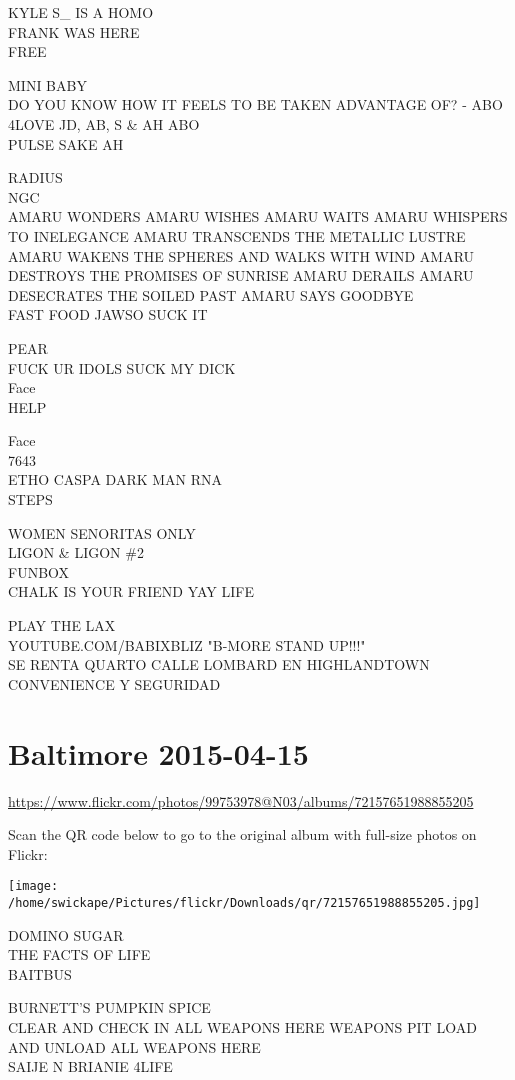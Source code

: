 \documentclass[10pt,letterpaper]{article}
\begin{document}
KYLE S\_ IS A HOMO\\
FRANK WAS HERE\\
FREE

MINI BABY\\
DO YOU KNOW HOW IT FEELS TO BE TAKEN ADVANTAGE OF? {-} ABO\\
4LOVE JD, AB, S \& AH ABO\\
PULSE SAKE AH

RADIUS\\
NGC\\
AMARU WONDERS AMARU WISHES AMARU WAITS AMARU WHISPERS TO INELEGANCE AMARU TRANSCENDS THE METALLIC LUSTRE AMARU WAKENS THE SPHERES AND WALKS WITH WIND AMARU DESTROYS THE PROMISES OF SUNRISE AMARU DERAILS AMARU DESECRATES THE SOILED PAST AMARU SAYS GOODBYE\\
FAST FOOD JAWSO SUCK IT

PEAR\\
FUCK UR IDOLS SUCK MY DICK\\
Face\\
HELP

Face\\
7643\\
ETHO CASPA DARK MAN RNA\\
STEPS

WOMEN SENORITAS ONLY\\
LIGON \& LIGON \#2\\
FUNBOX\\
CHALK IS YOUR FRIEND YAY LIFE

PLAY THE LAX\\
YOUTUBE.COM/BABIXBLIZ "B{-}MORE STAND UP!!!"\\
SE RENTA QUARTO CALLE LOMBARD EN HIGHLANDTOWN CONVENIENCE Y SEGURIDAD


\section*{Baltimore 2015-04-15}

\url{https://www.flickr.com/photos/99753978@N03/albums/72157651988855205}

Scan the QR code below to go to the original album with full-size photos on Flickr:

\texttt{[image: /home/swickape/Pictures/flickr/Downloads/qr/72157651988855205.jpg]}


DOMINO SUGAR\\
THE FACTS OF LIFE\\
BAITBUS

BURNETT'S PUMPKIN SPICE\\
CLEAR AND CHECK IN ALL WEAPONS HERE WEAPONS PIT LOAD AND UNLOAD ALL WEAPONS HERE\\
SAIJE N BRIANIE 4LIFE
\end{document}
